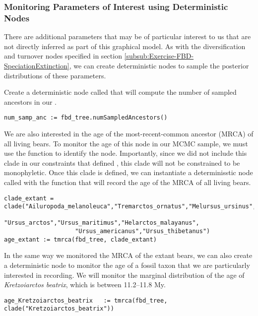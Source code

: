 \subsubsection{Monitoring Parameters of Interest using Deterministic Nodes}\label{subsub:Exercise-FBD-DetNodes}

There are additional parameters that may be of particular interest to us that are not directly inferred as part of this graphical model. 
As with the diversification and turnover nodes specified in section \ref{subsub:Exercise-FBD-SpeciationExtinction}, we can create deterministic nodes to sample the posterior distributions of these parameters. 
%

Create a deterministic node called  that will compute the number of sampled ancestors in our .
{\tt \begin{snugshade*}
\begin{lstlisting}
num_samp_anc := fbd_tree.numSampledAncestors()
\end{lstlisting}
\end{snugshade*}}


We are also interested in the age of the most-recent-common ancestor (MRCA) of all living bears. 
To monitor the age of this node in our MCMC sample, we must use the  function to identify the node. Importantly, since we did not include this clade in our constraints that defined , this clade will not be constrained to be monophyletic. 
Once this clade is defined, we can instantiate a determinisstic node called  with the  function that will record the age of the MRCA of all living bears.
{\tt \begin{snugshade*}
\begin{lstlisting}
clade_extant = clade("Ailuropoda_melanoleuca","Tremarctos_ornatus","Melursus_ursinus",
                    "Ursus_arctos","Ursus_maritimus","Helarctos_malayanus",
                    "Ursus_americanus","Ursus_thibetanus")
age_extant := tmrca(fbd_tree, clade_extant)
\end{lstlisting}
\end{snugshade*}}

In the same way we monitored the MRCA of the extant bears, we can also create a deterministic node to monitor the age of a fossil taxon that we are particularly interested in recording. 
We will monitor the marginal distribution of the age of \textit{Kretzoiarctos beatrix}, which is between 11.2--11.8 My.
{\tt \begin{snugshade*}
\begin{lstlisting}
age_Kretzoiarctos_beatrix   := tmrca(fbd_tree, clade("Kretzoiarctos_beatrix"))
\end{lstlisting}
\end{snugshade*}}

